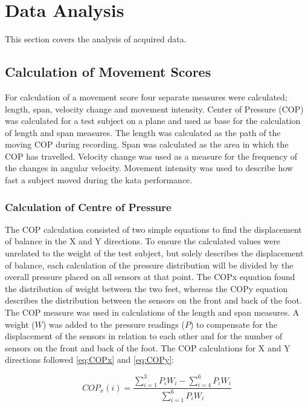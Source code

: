 \section{Data Analysis}
This section covers the analysis of acquired data.

\subsection{Calculation of Movement Scores}

For calculation of a movement score four separate measures were calculated; length, span, velocity change and movement intensity. Center of Pressure (COP) was calculated for a test subject on a plane and used as base for the calculation of length and span measures. The length was calculated as the path of the moving COP during recording. Span was calculated as the area in which the COP has travelled. Velocity change was used as a measure for the frequency of the changes in angular velocity. Movement intensity was used to describe how fast a subject moved during the kata performance. 

\subsubsection{Calculation of Centre of Pressure}
The COP calculation consisted of two simple equations to find the displacement of balance in the X and Y directions. To ensure the calculated values were unrelated to the weight of the test subject, but solely describes the displacement of balance, each calculation of the pressure distribution will be divided by the overall pressure placed on all sensors at that point. The COP\lowercase{x} equation found the distribution of weight between the two feet, whereas the COP\lowercase{y} equation describes the distribution between the sensors on the front and back of the foot. The COP measure was used in calculations of the length and span measures. A weight ($W$) was added to the pressure readings ($P$) to compensate  for the displacement of the sensors in relation to each other and for the number of sensors on the front and back of the foot.
The COP calculations for X and Y directions followed \eqref{eq:COPx} and \eqref{eq:COPy}:

\begin{equation} \label{eq:COPx}
COP_x(i) =  \frac{\sum_{i=1}^{3}P_i W_i - \sum_{i=4}^{6}P_i W_i}{\sum_{i=1}^{6}P_i W_i}
\end{equation} 

